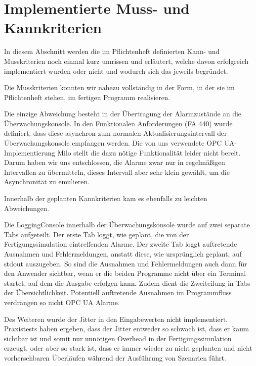 \documentclass[parskip=full]{scrartcl}
\begin{document}
\section{Implementierte Muss- und Kannkriterien}
In diesem Abschnitt werden die im Pflichtenheft definierten Kann- und Musskriterien noch einmal kurz umrissen und erläutert, welche davon erfolgreich
implementiert wurden oder nicht und wodurch sich das jeweils begründet.

Die Musskriterien konnten wir nahezu vollständig in der Form, in der sie im Pflichtenheft stehen, im fertigen Programm realisieren.

Die einzige Abweichung besteht in der Übertragung der Alarmzustände an die Überwachungskonsole. In den Funktionalen Anforderungen (FA 440) wurde definiert,
dass diese asynchron zum normalen Aktualisierungsintervall der Überwachungskonsole empfangen werden. Die von uns verwendete OPC UA-Implementierung Milo
stellt die dazu nötige Funktionalität leider nicht bereit. Darum haben wir uns entschlossen, die Alarme zwar nur in regelmäßigen Intervallen zu übermitteln,
dieses Intervall aber sehr klein gewählt, um die Asynchronität zu emulieren.

Innerhalb der geplanten Kannkriterien kam es ebenfalls zu leichten Abweichungen.

Die LoggingConsole innerhalb der Überwachungskonsole wurde auf zwei separate Tabs aufgeteilt. Der erste Tab loggt, wie geplant, die von der Fertigungssimulation
eintreffenden Alarme. Der zweite Tab loggt auftretende Ausnahmen und Fehlermeldungen, anstatt diese, wie ursprünglich geplant, auf stdout auszugeben. So sind die
Ausnahmen und Fehlermeldungen auch dann für den Anwender sichtbar, wenn er die beiden Programme nicht über ein Terminal startet, auf dem die Ausgabe erfolgen kann.
Zudem dient die Zweiteilung in Tabs der Übersichtlichkeit. Potentiell auftretende Ausnahmen im Programmfluss verdrängen so nicht OPC UA Alarme.

Des Weiteren wurde der Jitter in den Eingabewerten nicht implementiert. Praxistests haben ergeben, dass der Jitter entweder so schwach ist, dass er kaum sichtbar
ist und somit nur unnötigen Overhead in der Fertigungssimulation erzeugt, oder aber so stark ist, dass er immer wieder zu nicht geplanten und nicht vorhersehbaren
Überläufen während der Ausführung von Szenarien führt.
\end{document}

